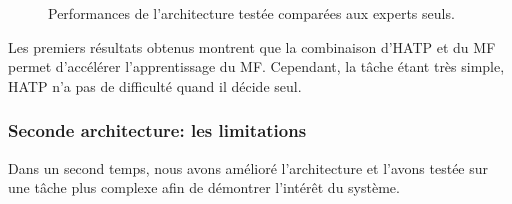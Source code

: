 \documentclass[english,a4paper,11pt,twoside]{StyleThese}
\begin{document}
\begin{figure}[!h]
\centering
	\hfill
    \caption{Performances de l'architecture testée comparées aux experts seuls.}
    \label{fig:resultsFirstTask}
\end{figure}

Les premiers résultats obtenus montrent que la combinaison d'HATP et du MF permet d’accélérer l'apprentissage du MF. Cependant, la tâche étant très simple, HATP n'a pas de difficulté quand il décide seul. 

\subsubsection{Seconde architecture: les limitations}

Dans un second temps, nous avons amélioré l'architecture et l'avons testée sur une tâche plus complexe afin de démontrer l’intérêt du système.
\end{document}
